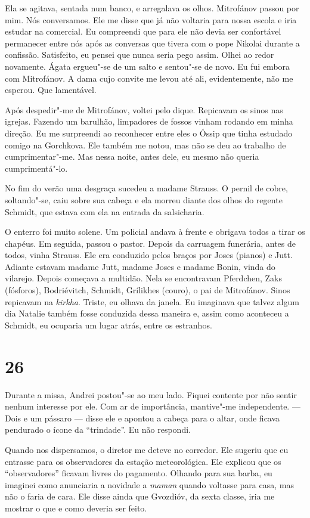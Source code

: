 Ela se agitava, sentada num banco, e arregalava os olhos. Mitrofánov
passou por mim. Nós conversamos. Ele me disse que já não voltaria para
nossa escola e iria estudar na comercial. Eu compreendi que para ele não
devia ser confortável permanecer entre nós após as conversas que tivera
com o pope Nikolai durante a confissão. Satisfeito, eu pensei que nunca
seria pego assim. Olhei ao redor novamente. Ágata ergueu"-se de um salto
e sentou"-se de novo. Eu fui embora com Mitrofánov. A dama cujo convite
me levou até ali, evidentemente, não me esperou. Que lamentável.

Após despedir"-me de Mitrofánov, voltei pelo dique. Repicavam os sinos
nas igrejas. Fazendo um barulhão, limpadores de fossos vinham rodando em
minha direção. Eu me surpreendi ao reconhecer entre eles o Óssip que
tinha estudado comigo na Gorchkova. Ele também me notou, mas não se deu
ao trabalho de cumprimentar"-me. Mas nessa noite, antes dele, eu mesmo
não queria cumprimentá"-lo.

No fim do verão uma desgraça sucedeu a madame Strauss. O pernil de
cobre, soltando"-se, caiu sobre sua cabeça e ela morreu diante dos olhos
do regente Schmidt, que estava com ela na entrada da salsicharia.

O enterro foi muito solene. Um policial andava à frente e obrigava todos
a tirar os chapéus. Em seguida, passou o pastor. Depois da carruagem
funerária, antes de todos, vinha Strauss. Ele era conduzido pelos braços
por Joses (pianos) e Jutt. Adiante estavam madame Jutt, madame Joses e
madame Bonin, vinda do vilarejo. Depois começava a multidão. Nela se
encontravam Pferdchen, Zaks (fósforos), Bodriévitch, Schmidt, Grílikhes
(couro), o pai de Mitrofánov. Sinos repicavam na \emph{kirkha}. Triste,
eu olhava da janela. Eu imaginava que talvez algum dia Natalie também
fosse conduzida dessa maneira e, assim como aconteceu a Schmidt, eu
ocuparia um lugar atrás, entre os estranhos.

\section{26}

Durante a missa, Andrei postou"-se ao meu lado. Fiquei contente por não
sentir nenhum interesse por ele. Com ar de importância, mantive"-me
independente. --- Dois e um pássaro --- disse ele e apontou a cabeça
para o altar, onde ficava pendurado o ícone da ``trindade''. Eu não
respondi.

Quando nos dispersamos, o diretor me deteve no corredor. Ele sugeriu que
eu entrasse para os observadores da estação meteorológica. Ele explicou
que os ``observadores'' ficavam livres do pagamento. Olhando para sua
barba, eu imaginei como anunciaria a novidade a \emph{maman} quando
voltasse para casa, mas não o faria de cara. Ele disse ainda que
Gvozdióv, da sexta classe, iria me mostrar o que e como deveria ser
feito.

